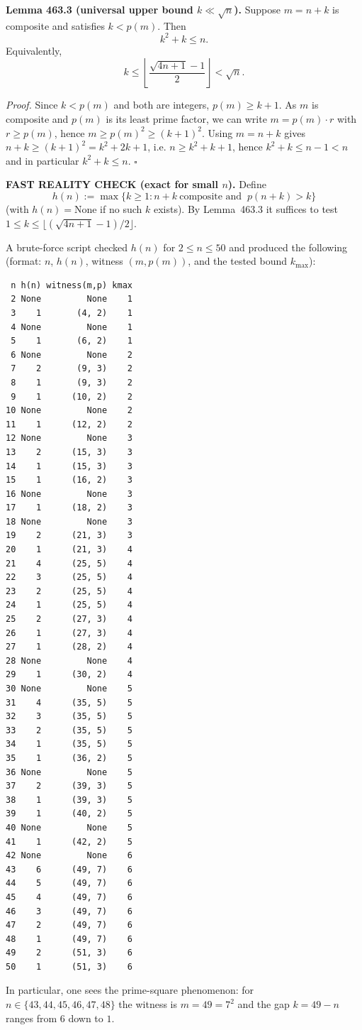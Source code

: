 \medskip
\noindent\textbf{Lemma 463.3 (universal upper bound $k\ll\sqrt{n}$).}
Suppose $m=n+k$ is composite and satisfies $k<p(m)$. Then
\[
 k^2+k\le n.
\]
Equivalently,
\[
 k\le \left\lfloor\frac{\sqrt{4n+1}-1}{2}\right\rfloor<\sqrt{n}.
\]

\textit{Proof.}
Since $k<p(m)$ and both are integers, $p(m)\ge k+1$. As $m$ is composite and $p(m)$ is its least prime factor, we can write $m=p(m)\cdot r$ with $r\ge p(m)$, hence $m\ge p(m)^2\ge (k+1)^2$. Using $m=n+k$ gives $n+k\ge (k+1)^2=k^2+2k+1$, i.e. $n\ge k^2+k+1$, hence $k^2+k\le n-1<n$ and in particular $k^2+k\le n$. \hfill$\square$

\medskip
\noindent\textbf{FAST REALITY CHECK (exact for small $n$).}
Define
\[
 h(n):=\max\{k\ge 1: n+k\ \text{composite and }\ p(n+k)>k\}
\]
(with $h(n)=\text{None}$ if no such $k$ exists). By Lemma~463.3 it suffices to test $1\le k\le \lfloor(\sqrt{4n+1}-1)/2\rfloor$.

A brute-force script checked $h(n)$ for $2\le n\le 50$ and produced the following (format: $n$, $h(n)$, witness $(m,p(m))$, and the tested bound $k_{\max}$):
\begin{verbatim}
 n h(n) witness(m,p) kmax
 2 None         None    1
 3    1       (4, 2)    1
 4 None         None    1
 5    1       (6, 2)    1
 6 None         None    2
 7    2       (9, 3)    2
 8    1       (9, 3)    2
 9    1      (10, 2)    2
10 None         None    2
11    1      (12, 2)    2
12 None         None    3
13    2      (15, 3)    3
14    1      (15, 3)    3
15    1      (16, 2)    3
16 None         None    3
17    1      (18, 2)    3
18 None         None    3
19    2      (21, 3)    3
20    1      (21, 3)    4
21    4      (25, 5)    4
22    3      (25, 5)    4
23    2      (25, 5)    4
24    1      (25, 5)    4
25    2      (27, 3)    4
26    1      (27, 3)    4
27    1      (28, 2)    4
28 None         None    4
29    1      (30, 2)    4
30 None         None    5
31    4      (35, 5)    5
32    3      (35, 5)    5
33    2      (35, 5)    5
34    1      (35, 5)    5
35    1      (36, 2)    5
36 None         None    5
37    2      (39, 3)    5
38    1      (39, 3)    5
39    1      (40, 2)    5
40 None         None    5
41    1      (42, 2)    5
42 None         None    6
43    6      (49, 7)    6
44    5      (49, 7)    6
45    4      (49, 7)    6
46    3      (49, 7)    6
47    2      (49, 7)    6
48    1      (49, 7)    6
49    2      (51, 3)    6
50    1      (51, 3)    6
\end{verbatim}
In particular, one sees the prime-square phenomenon: for $n\in\{43,44,45,46,47,48\}$ the witness is $m=49=7^2$ and the gap $k=49-n$ ranges from $6$ down to $1$.

